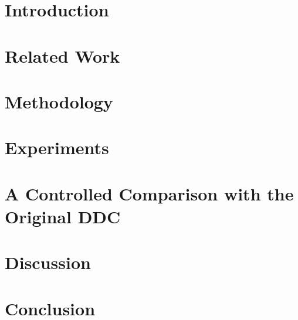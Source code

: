 \documentclass[12pt,a4paper]{report}
\newenvironment{acknowledgements}
  {\cleardoublepage\thispagestyle{plain}\chapter*{Acknowledgements}}
  {\cleardoublepage}
\begin{document}

\tableofcontents
\cleardoublepage
{}
\chapter{Introduction}


\chapter{Related Work}


\chapter{Methodology}


\chapter{Experiments}


\chapter{A Controlled Comparison with the Original DDC}


\chapter{Discussion}


\chapter{Conclusion}





\listoffigures
\listoftables

\appendix





\end{document}
